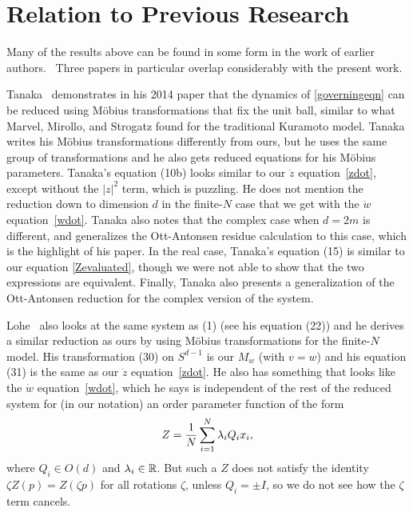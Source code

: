 \documentclass[%
 aip,
 amsmath,amssymb,
 reprint,%
]{revtex4-1}
\begin{document}
\section{\label{sec:level1}Relation to Previous Research}
Many of the results above can be found in some form in the work of earlier authors.~\cite{lohe2009non,tanaka2014solvable,chi2014emergent, ha2018relaxation, lohe2018higher, jacimovic2018low, chandra2019continuous, chandra2019complexity, lohe2019systems, ha2021constants, jacimovic2021reversibility} Three papers in particular overlap considerably with the present work.

Tanaka~\cite{tanaka2014solvable} demonstrates in his 2014 paper that the dynamics of \eqref{governingeqn} can be reduced using Möbius transformations that fix the unit ball, similar to what Marvel, Mirollo, and Strogatz found\cite{marvel2009identical} for the traditional Kuramoto model. Tanaka writes his M\"obius transformations differently from ours, but he uses the same group of transformations and he also gets reduced equations for his M\"obius parameters. Tanaka's equation (10b) looks similar to our $\dot z$ equation~\eqref{zdot}, except without the $|z|^2$ term, which is puzzling. He does not mention the reduction down to dimension $d$ in the finite-$N$ case that we get with the $\dot w$ equation~\eqref{wdot}. Tanaka also notes that the complex case when $d = 2m$ is different, and generalizes the Ott-Antonsen residue calculation to this case, which is the highlight of his paper.  In the real case, Tanaka's equation (15) is similar to our equation \eqref{Zevaluated}, though we were not able to show that the two expressions are equivalent. Finally, Tanaka also presents a generalization of the Ott-Antonsen reduction\cite{ott2008low} for the complex version of the system. 

Lohe~\cite{lohe2018higher} also looks at the same system as (1) (see his equation (22)) and he derives a similar reduction as ours by using Möbius transformations for the finite-$N$ model. His transformation (30) on $S^{d-1}$ is our $M_w$ (with $v = w$) and his equation (31) is the same as our $\dot z$ equation~\eqref{zdot}.  He also has something that looks like the $\dot w$ equation~\eqref{wdot}, which he says is independent of the rest of the reduced system for (in our notation) an order parameter function of the form
$$
Z = {1 \over N} \sum_{i = 1}^N \lambda_i Q_ix_i,
$$
where $Q_i \in O(d)$ and $\lambda_i \in \Bbb R$.  But such a $Z$ does not satisfy the identity $ \zeta Z(p) = Z(\zeta p)$ for all rotations $\zeta$, unless $Q_i = \pm  I$, so we do not see how the $\zeta$ term cancels. 
\end{document}
